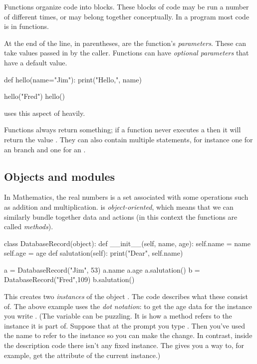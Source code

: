 Functions organize code into blocks. 
These blocks of code may be 
run a number of different times, or may belong together conceptually. 
In a \python{} program most code is in functions. 

At the end of the  line, in parentheses, are
the function's \textit{parameters}. 
These can take values 
passed in by the caller.
Functions can have \textit{optional parameters} that have a default value.
\begin{pyconsole}
def hello(name="Jim"):
    print("Hello,", name)

hello("Fred")
hello()
\end{pyconsole}
\noindent
\Sage{} uses this aspect of \python{} heavily.

Functions always return something; 
if a function never executes a  then it will
return the value .
They can also contain multiple  statements, for instance 
one for an  branch and one for an .




\subsection{Objects and modules}
In Mathematics, the real numbers is a set associated with some operations
such as addition and multiplication.
\python{} is \textit{object-oriented}, which means that we can similarly bundle
together data and actions (in this context the functions are called 
\textit{methods}).
\begin{pyconsole}
class DatabaseRecord(object):
    def __init__(self, name, age):
        self.name = name
        self.age = age
    def salutation(self):
        print("Dear", self.name)

a = DatabaseRecord("Jim", 53)
a.name
a.age
a.salutation()
b = DatabaseRecord("Fred",109)
b.salutation()
\end{pyconsole}
\noindent
This creates two \textit{instances} of the object 
.
The  code describes what these consist of.
The above example uses the \textit{dot notation}:
to get the age data for the instance 
you write 
.
(The \protect{} variable 
can  be puzzling.
It is how a method refers to the instance it is part of.
Suppose that at the prompt you type .
Then you've used the name  
to refer to the instance so you can
make the change.
In contrast,
inside the  description code there isn't any fixed instance. 
The  gives you a way to, for example, 
get the  attribute
of the current instance.)

